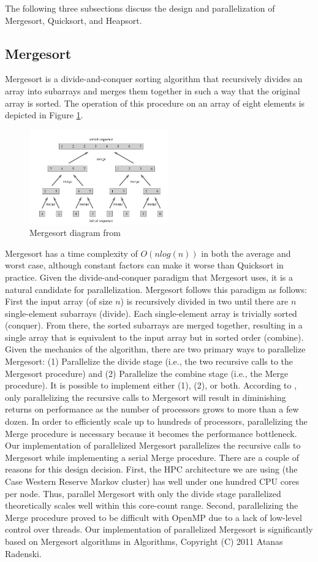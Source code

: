 \documentclass[conference]{IEEEtran}
\begin{document}
The following three subsections discuss the design and parallelization of Mergesort, Quicksort, and Heapsort.

\subsection{Mergesort}
Mergesort is a divide-and-conquer sorting algorithm that recursively divides an array into subarrays and merges them together in such a way that the original array is sorted. 
The operation of this procedure on an array of eight elements is depicted in Figure \ref{mrg}.  
\begin{figure}[h]
	\includegraphics[width=6cm]{merge.png} 
	\caption{Mergesort diagram from \cite{cormen_introduction_2009}}
	\label{mrg}
\end{figure}
Mergesort has a time complexity of $O(nlog(n))$ in both the average and worst case, although constant factors can make it worse than Quicksort in practice. 
Given the divide-and-conquer paradigm that Mergesort uses, it is a natural candidate for parallelization. Mergesort follows this paradigm as follows: First the input array (of size $n$) is recursively divided in two until there are $n$ single-element subarrays (divide). Each single-element array is trivially sorted (conquer). From there, the sorted subarrays are merged together, resulting in a single array that is equivalent to the input array but in sorted order (combine). Given the mechanics of the algorithm, there are two primary ways to parallelize Mergesort: (1) Parallelize the divide stage (i.e., the two recursive calls to the Mergesort procedure) and (2) Parallelize the combine stage (i.e., the Merge procedure). It is possible to implement either (1), (2), or both. According to \cite{cormen_introduction_2009}, only parallelizing the recursive calls to Mergesort will result in diminishing returns on performance as the number of processors grows to more than a few dozen. In order to efficiently scale up to hundreds of processors, parallelizing the Merge procedure is necessary because it becomes the performance bottleneck.
Our implementation of parallelized Mergesort parallelizes the recursive calls to Mergesort while implementing a serial Merge procedure. There are a couple of reasons for this design decision. First, the HPC architecture we are using (the Case Western Reserve Markov cluster) has well under one hundred CPU cores per node. Thus, parallel Mergesort with only the divide stage parallelized theoretically scales well within this core-count range. Second, parallelizing the Merge procedure proved to be difficult with OpenMP due to a lack of low-level control over threads. Our implementation of parallelized Mergesort is significantly based on Mergesort algorithms in Algorithms, Copyright (C) 2011  Atanas Radenski.
\end{document}
